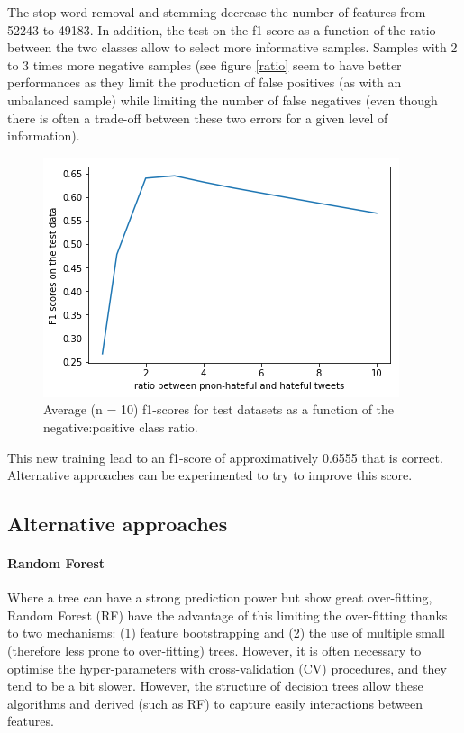\documentclass[a4paper, justified]{tufte-handout}
\begin{document}
\begin{fullwidth}
The stop word removal and stemming decrease the number of features from 52243 to 49183.
In addition, the test on the f1-score as a function of the ratio between the two classes allow to select more informative samples. Samples with 2 to 3 times more negative samples (see figure \ref{ratio} seem to have better performances as they limit the production of false positives (as with an unbalanced sample) while limiting the number of false negatives (even though there is often a trade-off between these two errors for a given level of information).

\begin{figure}\label{ratio}
  \includegraphics[]{images/sample_ratio_TSA.png}
  \caption{Average (n = 10) f1-scores for test datasets as a function of the negative:positive class ratio.}
  \label{fig:marginfig}
\end{figure}

This new training lead to an f1-score of approximatively 0.6555 that is correct. Alternative approaches can be experimented to try to improve this score.

\subsection{Alternative approaches}

\paragraph{Random Forest}

Where a tree can have a strong prediction power but show great over-fitting, Random Forest (RF) have the advantage of this limiting the over-fitting thanks to two mechanisms: (1) feature bootstrapping and (2) the use of multiple small (therefore less prone to over-fitting) trees. However, it is often necessary to optimise the hyper-parameters with cross-validation (CV) procedures, and they tend to be a bit slower. However, the structure of decision trees allow these algorithms and derived (such as RF) to capture easily interactions between features.


\end{fullwidth}
\end{document}
